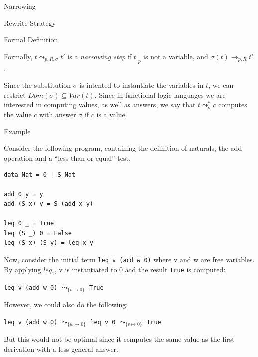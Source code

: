 \documentclass{beamer}
\begin{document}
\begin{section}{Narrowing}
\begin{subsection}{Rewrite Strategy}
\end{subsection}

\begin{subsection}{Formal Definition}
\begin{frame}
  Formally, $t \leadsto _{p,R,\sigma} t'$ is a \textit{narrowing step} if $t|_p$ is not a variable, and $\sigma(t) \rightarrow_{p,R} t'$.

  Since the substitution $\sigma$ is intented to instantiate the variables in $t$, we can restrict $Dom(\sigma) \subseteq Var(t)$. Since in functional logic languages we are interested in computing values, as well as answers, we say that $t \leadsto ^ * _ \sigma c$ computes the value $c$ with answer $\sigma$ if $c$ is a value.
  \end{frame}
\end{subsection}

\begin{subsection}{Example}
  
\begin{frame}[fragile]
  
  Consider the following program, containing the definition of naturals, the add operation and a ``less than or equal'' test.\\[0.5cm]


\begin{minipage}[b]{2in}
\begin{verbatim}
data Nat = 0 | S Nat

add 0 y = y
add (S x) y = S (add x y)

leq 0 _ = True
leq (S _) 0 = False
leq (S x) (S y) = leq x y
\end{verbatim}
\end{minipage}
\end{frame}

\begin{frame}[fragile]

  Now, consider the initial term \verb|leq v (add w 0)| where v and w are free variables. By applying $leq_1$, v is instantiated to 0 and the result \verb|True| is computed:

\begin{center}

\verb|leq v (add w 0)| $\leadsto_{\{v\mapsto 0\}}$ \verb|True|
  
\end{center}

However, we could also do the following:

\begin{center}

\verb|leq v (add w 0)| $\leadsto_{\{w\mapsto 0\}}$ \verb|leq v 0| $\leadsto_{\{v\mapsto 0\}}$ \verb|True|
  
\end{center}

But this would not be optimal since it computes the same value as the first derivation with a less general answer.

\end{frame}

\end{subsection}
\end{section}
\end{document}
